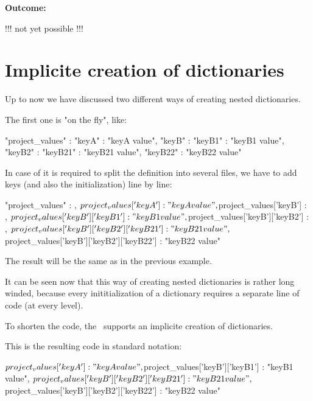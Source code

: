 \vspace{2ex}

\textbf{Outcome:}

\begin{pythonlog}
!!! not yet possible !!!
\end{pythonlog}



\newpage

\section{Implicite creation of dictionaries}

Up to now we have discussed two different ways of creating nested dictionaries.

The first one is "on the fly", like:

\begin{pythoncode}
{
   "project_values" : {"keyA" : "keyA value",
                       "keyB" : {"keyB1" : "keyB1 value",
                                 "keyB2" : {"keyB21" : "keyB21 value",
                                            "keyB22" : "keyB22 value"}}}
}
\end{pythoncode}

In case of it is required to split the definition into several files, we have to add keys (and also the initialization) line by line:

\begin{pythoncode}
{
   "project_values" : {},
   ${project_values}['keyA'] : "keyA value",
   ${project_values}['keyB'] : {},
   ${project_values}['keyB']['keyB1'] : "keyB1 value",
   ${project_values}['keyB']['keyB2'] : {},
   ${project_values}['keyB']['keyB2']['keyB21'] : "keyB21 value",
   ${project_values}['keyB']['keyB2']['keyB22'] : "keyB22 value"
}
\end{pythoncode}

The result will be the same as in the previous example.

It can be seen now that this way of creating nested dictionaries is rather long winded, because every inititialization of a dictionary
requires a separate line of code (at every level).

To shorten the code, the \pkg\ supports an implicite creation of dictionaries.

This is the resulting code in standard notation:

\begin{pythoncode}
{
   ${project_values}['keyA'] : "keyA value",
   ${project_values}['keyB']['keyB1'] : "keyB1 value",
   ${project_values}['keyB']['keyB2']['keyB21'] : "keyB21 value",
   ${project_values}['keyB']['keyB2']['keyB22'] : "keyB22 value"
}
\end{pythoncode}

